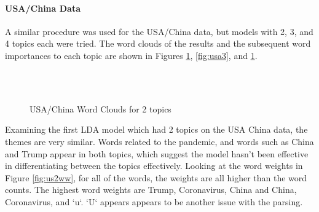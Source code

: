 \paragraph{USA/China Data}
A similar procedure was used for the USA/China data, but models with 2, 3, and 4 topics each were tried. The word clouds of the results and the subsequent word importances to each topic are shown in Figures \ref{fig:usa2}, \ref{fig:usa3}, and \ref{fig:usa2}. 
\begin{figure}[H]
	\centering
	\\
	\\
	
	\caption{USA/China Word Clouds for 2 topics}
	\label{fig:usa2}
\end{figure}
Examining the first LDA model which had 2 topics on the USA China data, the themes are very similar. Words related to the pandemic, and words such as China and Trump appear in both topics, which suggest the model hasn't been effective in differentiating between the topics effectively. Looking at the word weights in Figure \ref{fig:us2ww}, for all of the words, the weights are all higher than the word counts. The highest word weights are Trump, Coronavirus, China and China, Coronavirus, and `u`. `U` appears appears to be another issue with the parsing.  
